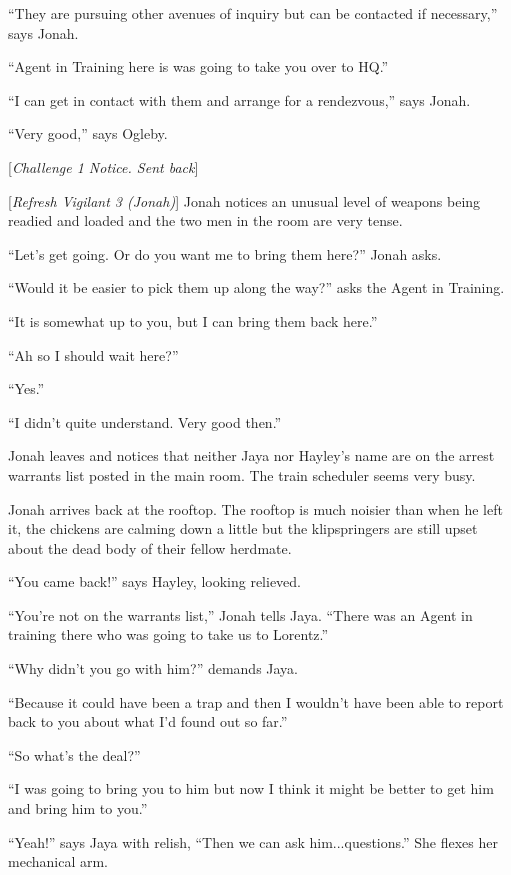 ``They are pursuing other avenues of inquiry but can be contacted if necessary,'' says Jonah.

``Agent in Training here is was going to take you over to HQ.''

``I can get in contact with them and arrange for a rendezvous,'' says Jonah.

``Very good,'' says Ogleby.

{[}\textit{Challenge 1 Notice. Sent back}{]}

{[}\textit{Refresh Vigilant 3 (Jonah)}{]}  Jonah notices an unusual level of weapons being readied and loaded and the two men in the room are very tense. 

``Let's get going.  Or do you want me to bring them here?'' Jonah asks.

``Would it be easier to pick them up along the way?'' asks the Agent in Training.

``It is somewhat up to you, but I can bring them back here.''

``Ah so I should wait here?''

``Yes.''

``I didn't quite understand.  Very good then.''

Jonah leaves and notices that neither Jaya nor Hayley's name are on the arrest warrants list posted in the main room.  The train scheduler seems very busy.



Jonah arrives back at the rooftop.  The rooftop is much noisier than when he left it, the chickens are calming down a little but the klipspringers are still upset about the dead body of their fellow herdmate.

``You came back!'' says Hayley, looking relieved.

``You're not on the warrants list,'' Jonah tells Jaya.  ``There was an Agent in training there who was going to take us to Lorentz.''

``Why didn't you go with him?'' demands Jaya.

``Because it could have been a trap and then I wouldn't have been able to report back to you about what I'd found out so far.''

``So what's the deal?''

``I was going to bring you to him but now I think it might be better to get him and bring him to you.''

``Yeah!'' says Jaya with relish, ``Then we can ask him...questions.''  She flexes her mechanical arm.

